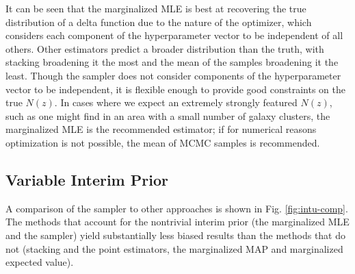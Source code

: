 \documentclass[preprint]{aastex}
\begin{document}
It can be seen that the marginalized MLE is best at recovering the true 
distribution of a delta function due to the nature of the optimizer, which 
considers each component of the hyperparameter vector to be independent of all 
others.  Other estimators predict a broader distribution than the truth, with 
stacking broadening it the most and the mean of the samples broadening it the 
least.  Though the sampler does not consider components of the hyperparameter 
vector to be independent, it is flexible enough to provide good constraints on 
the true $N(z)$.  In cases where we expect an extremely strongly featured 
$N(z)$, such as one might find in an area with a small number of galaxy 
clusters, the marginalized MLE is the recommended estimator; if for numerical 
reasons optimization is not possible, the mean of MCMC samples is recommended.

\subsection{Variable Interim Prior}
\label{sec:interim}

A comparison of the sampler to other approaches is shown in Fig. 
\ref{fig:intu-comp}.  The methods that account for the nontrivial interim prior 
(the marginalized MLE and the sampler) yield substantially less biased results 
than the methods that do not (stacking and the point estimators, the 
marginalized MAP and marginalized expected value).

\end{document}
